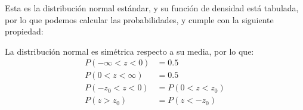\documentclass{article}
\theoremstyle{definition}
\theoremstyle{plain}
\theoremstyle{remark}
\begin{document}
Esta es la distribución normal estándar, y su función de densidad está tabulada, por lo que podemos calcular las probabilidades, y cumple con la siguiente propiedad:

La distribución normal es simétrica respecto a su media, por lo que:
\begin{align*}
P(-\infty < z < 0) &= 0.5 \\
P(0 < z < \infty) &= 0.5 \\
P(-z_0 < z < 0) &= P(0 < z < z_0) \\
P(z > z_0) &= P(z < -z_0)
\end{align*}
\end{document}
